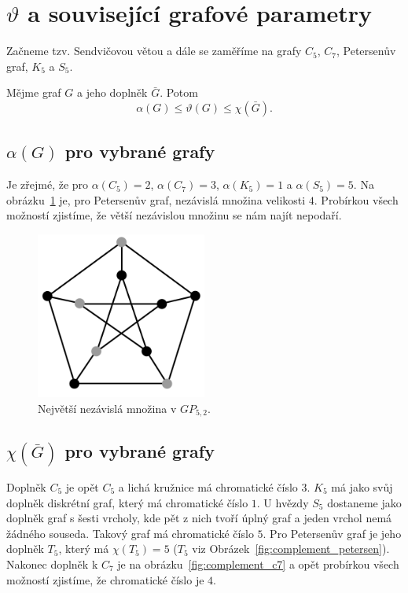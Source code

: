 \section{$\vartheta$ a související grafové parametry}

Začneme tzv. Sendvičovou větou a dále se zaměříme na grafy $C_5$, $C_7$, Petersenův graf, $K_5$ a $S_5$.

\begin{vt}\cite{knuth-sandwich}
    Mějme graf $G$ a jeho doplněk $\bar{G}$. Potom
    $$
        \alpha(G) \leq \vartheta(G) \leq \chi(\bar{G}).
    $$
\end{vt}

\subsection*{$\alpha(G)$ pro vybrané grafy}
Je zřejmé, že pro $\alpha(C_5) = 2$, $\alpha(C_7) = 3$, $\alpha(K_5) = 1$ a $\alpha(S_5) = 5$. Na obrázku~\ref{fig:alpha_petersen} je, pro Petersenův graf, nezávislá množina velikosti $4$. Probírkou všech možností zjistíme, že větší nezávislou množinu se nám najít nepodaří.

\begin{figure}[h!]
    \centering
    \includegraphics[width=0.5\textwidth]{img/alpha_petersen.jpeg}   
    \caption{Největší nezávislá množina v $GP_{5,2}$.}
    \label{fig:alpha_petersen}
\end{figure}

\subsection*{$\chi(\bar{G})$ pro vybrané grafy}

Doplněk $C_5$ je opět $C_5$ a lichá kružnice má chromatické číslo $3$. $K_5$ má jako svůj doplněk diskrétní graf, který má chromatické číslo $1$. U hvězdy $S_5$ dostaneme jako doplněk graf s šesti vrcholy, kde pět z nich tvoří úplný graf a jeden vrchol nemá žádného souseda. Takový graf má chromatické číslo $5$. Pro Petersenův graf je jeho doplněk $T_5$, který má $\chi(T_5) = 5$ ($T_5$ viz Obrázek~\ref{fig:complement_petersen}). Nakonec doplněk k $C_7$ je na obrázku~\ref{fig:complement_c7} a opět probírkou všech možností zjistíme, že chromatické číslo je $4$.

